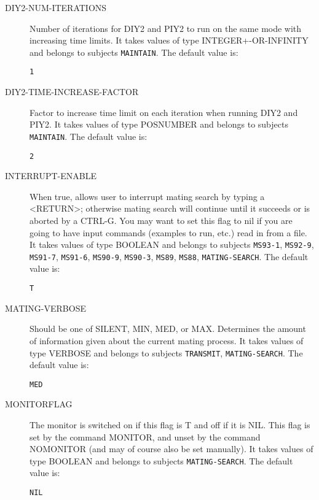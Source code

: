 \begin{description}
\item[DIY2-NUM-ITERATIONS]  
Number of iterations for DIY2 and PIY2 to run on the same mode with 
increasing time limits.
It takes values of type INTEGER+-OR-INFINITY and belongs to subjects \texttt{MAINTAIN}.  The default value is: \begin{lstlisting}
1
\end{lstlisting}

\item[DIY2-TIME-INCREASE-FACTOR]  
Factor to increase time limit on each iteration when running 
DIY2 and PIY2.
It takes values of type POSNUMBER and belongs to subjects \texttt{MAINTAIN}.  The default value is: \begin{lstlisting}
2
\end{lstlisting}

\item[INTERRUPT-ENABLE]  
When true, allows user to interrupt mating search by typing
a <RETURN>; otherwise mating search will continue until it succeeds
or is aborted by a CTRL-G.  You may want to set this flag to nil
if you are going to have input commands (examples to run, etc.) read
in from a file.
It takes values of type BOOLEAN and belongs to subjects \texttt{MS93-1}, \texttt{MS92-9}, \texttt{MS91-7}, \texttt{MS91-6}, \texttt{MS90-9}, \texttt{MS90-3}, \texttt{MS89}, \texttt{MS88}, \texttt{MATING-SEARCH}.  The default value is: \begin{lstlisting}
T
\end{lstlisting}

\item[MATING-VERBOSE]  
Should be one of SILENT, MIN, MED, or MAX.  Determines the amount of
information given about the current mating process.
It takes values of type VERBOSE and belongs to subjects \texttt{TRANSMIT}, \texttt{MATING-SEARCH}.  The default value is: \begin{lstlisting}
MED
\end{lstlisting}

\item[MONITORFLAG]  
The monitor is switched on if this flag is T and off if it is NIL.
This flag is set by the command MONITOR, and unset by the command NOMONITOR
(and may of course also be set manually).
It takes values of type BOOLEAN and belongs to subjects \texttt{MATING-SEARCH}.  The default value is: \begin{lstlisting}
NIL
\end{lstlisting}


\end{description}
